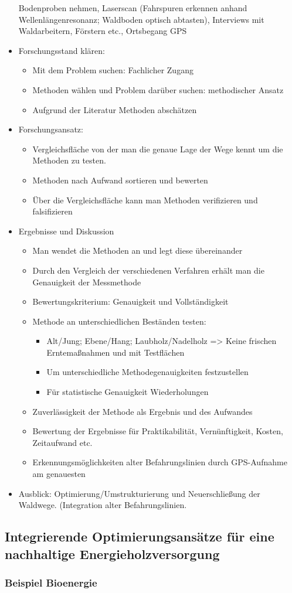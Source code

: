 \documentclass[12pt]{article}
\begin{document}
\begin{itemize}
      Bodenproben nehmen, Laserscan (Fahrspuren erkennen anhand Wellenlängenresonanz; Waldboden optisch abtasten), Interviews mit
      Waldarbeitern, Förstern etc., Ortsbegang GPS
\item Forschungsstand klären: 
\begin{itemize}
 \item Mit dem Problem suchen: Fachlicher Zugang
 \item Methoden wählen und Problem darüber suchen: methodischer Ansatz
 \item Aufgrund der Literatur Methoden abschätzen
\end{itemize}
\item Forschungsansatz:
\begin{itemize}
 \item Vergleichsfläche von der man die genaue Lage der Wege kennt um die Methoden zu testen.
 \item Methoden nach Aufwand sortieren und bewerten
 \item Über die Vergleichsfläche kann man Methoden verifizieren und falsifizieren
\end{itemize}
\item Ergebnisse und Diskussion
\begin{itemize}
 \item Man wendet die Methoden an und legt diese übereinander
 \item Durch den Vergleich der verschiedenen Verfahren erhält man die Genauigkeit der Messmethode
 \item Bewertungskriterium: Genauigkeit und Vollständigkeit 
 \item Methode an unterschiedlichen Beständen testen:
\begin{itemize}
 \item Alt/Jung; Ebene/Hang; Laubholz/Nadelholz => Keine frischen Erntemaßnahmen und mit Testflächen
 \item Um unterschiedliche Methodegenauigkeiten festzustellen
 \item Für statistische Genauigkeit Wiederholungen 
\end{itemize}
 \item Zuverlässigkeit der Methode als Ergebnis und des Aufwandes
 \item Bewertung der Ergebnisse für Praktikabilität, Vernünftigkeit, Kosten, Zeitaufwand etc. 
 \item Erkennungsmöglichkeiten alter Befahrungslinien durch GPS-Aufnahme am genauesten
\end{itemize}
\item Ausblick: Optimierung/Umstrukturierung und Neuerschließung der Waldwege. (Integration alter Befahrungslinien.
\end{itemize}

\subsection*{Integrierende Optimierungsansätze für eine nachhaltige Energieholzversorgung}
\subsubsection*{Beispiel Bioenergie}
\end{document}
